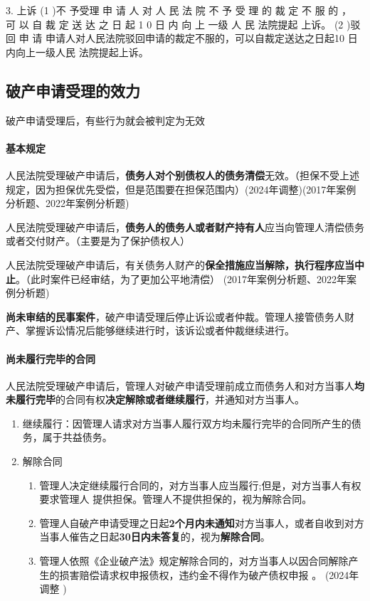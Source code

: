 \documentclass[UTF8,12pt]{ctexart}
\numberwithin{equation}{section} %
\numberwithin{figure}{section}
\numberwithin{table}{section}
\begin{document}
	3. 上诉
	(1 )不 予受理
	申 请 人 对 人 民 法 院 不 予 受 理 的 裁 定 不 服 的 ， 可 以 自 裁 定 送 达 之 日 起 1 0 日 内 向 上 一级 人 民 法院提起 上诉。
	(2 )驳 回 申 请
	申请人对人民法院驳回申请的裁定不服的，可以自裁定送达之日起10 日内向上一级人民 法院提起上诉。
	
	\subsection{破产申请受理的效力}
	破产申请受理后，有些行为就会被判定为无效
	
	\paragraph{基本规定}
	人民法院受理破产申请后，\textbf{债务人对个别债权人的债务清偿}无效。（担保不受上述规定，因为担保优先受偿，但是范围要在担保范围内）(2024年调整)(2017年案例分析题、2022年案例分析题)

	人民法院受理破产申请后，\textbf{债务人的债务人或者财产持有人}应当向管理人清偿债务或者交付财产。（主要是为了保护债权人）
	
	人民法院受理破产申请后，有关债务人财产的\textbf{保全措施应当解除，执行程序应当中止}。（此时案件已经审结，为了更加公平地清偿） (2017年案例分析题、2022年案例分析题)

	\textbf{尚未审结的民事案件}，破产申请受理后停止诉讼或者仲裁。管理人接管债务人财产、掌握诉讼情况后能够继续进行时，该诉讼或者仲裁继续进行。
	
	\paragraph{尚未履行完毕的合同}
	人民法院受理破产申请后，管理人对破产申请受理前成立而债务人和对方当事人\textbf{均未履行完毕}的合同有权\textbf{决定解除或者继续履行}，并通知对方当事人。
	\begin{enumerate}
		\item 继续履行：因管理人请求对方当事人履行双方均未履行完毕的合同所产生的债务，属于共益债务。 
		
		\item 解除合同
		\begin{enumerate}
			\item 管理人决定继续履行合同的，对方当事人应当履行;但是，对方当事人有权要求管理人 提供担保。管理人不提供担保的，视为解除合同。
			
			\item 管理人自破产申请受理之日起\textbf{2个月内未通知}对方当事人，或者自收到对方当事人催告之日起\textbf{30日内未答复}的，视为\textbf{解除合同}。 
			
			\item 管理人依照《企业破产法》规定解除合同的，对方当事人以因合同解除产生的损害赔偿请求权申报债权，违约金不得作为破产债权申报 。 (2024年调整 )
		\end{enumerate}
		
	\end{enumerate}
	
\end{document}
